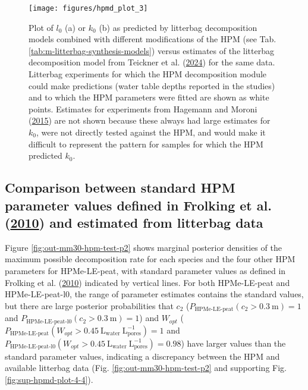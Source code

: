 \documentclass[
  12pt,
]{article}
\begin{document}
\begin{figure}[H]

{\centering \texttt{[image: figures/hpmd\_plot\_3]} 

}

\caption{Plot of \(l_0\) (a) or \(k_0\) (b) as predicted by litterbag decomposition models combined with different modifications of the HPM (see Tab. \ref{tab:m-litterbag-synthesis-models}) versus estimates of the litterbag decomposition model from Teickner et al. (\protect\hyperlink{ref-Teickner.2024}{2024}) for the same data. Litterbag experiments for which the HPM decomposition module could make predictions (water table depths reported in the studies) and to which the HPM parameters were fitted are shown as white points. Estimates for experiments from Hagemann and Moroni (\protect\hyperlink{ref-Hagemann.2015}{2015}) are not shown because these always had large estimates for \(k_0\), were not directly tested against the HPM, and would make it difficult to represent the pattern for samples for which the HPM predicted \(k_0\).}\label{fig:out-sdm-all-models-p2}
\end{figure}

\hypertarget{comparison-between-standard-hpm-parameter-values-defined-in-frolking.2010-and-estimated-from-litterbag-data}{%
\subsection{\texorpdfstring{Comparison between standard HPM parameter values defined in Frolking et al. (\protect\hyperlink{ref-Frolking.2010}{2010}) and estimated from litterbag data}{Comparison between standard HPM parameter values defined in Frolking et al. (2010) and estimated from litterbag data}}\label{comparison-between-standard-hpm-parameter-values-defined-in-frolking.2010-and-estimated-from-litterbag-data}}

Figure \ref{fig:out-mm30-hpm-test-p2} shows marginal posterior densities of the maximum possible decomposition rate for each species and the four other HPM parameters for HPMe-LE-peat, with standard parameter values as defined in Frolking et al. (\protect\hyperlink{ref-Frolking.2010}{2010}) indicated by vertical lines. For both HPMe-LE-peat and HPMe-LE-peat-l0, the range of parameter estimates contains the standard values, but there are large posterior probabilities that \(c_2\) (\(P_\text{HPMe-LE-peat}(c_2>0.3~\mathrm{m}) = 1\) and \(P_\text{HPMe-LE-peat-l0}(c_2>0.3~\mathrm{m}) = 1\)) and \(W_{opt}\) (\(P_\text{HPMe-LE-peat}(W_{opt}>0.45~\mathrm{L}_\mathrm{water}~\mathrm{L}_\mathrm{pores}^{-1}) = 1\) and \(P_\text{HPMe-LE-peat-l0}(W_{opt}>0.45~\mathrm{L}_\mathrm{water}~\mathrm{L}_\mathrm{pores}^{-1}) = 0.98\)) have larger values than the standard parameter values, indicating a discrepancy between the HPM and available litterbag data (Fig. \ref{fig:out-mm30-hpm-test-p2} and supporting Fig. \ref{fig:sup-hpmd-plot-4-4}).
\end{document}
